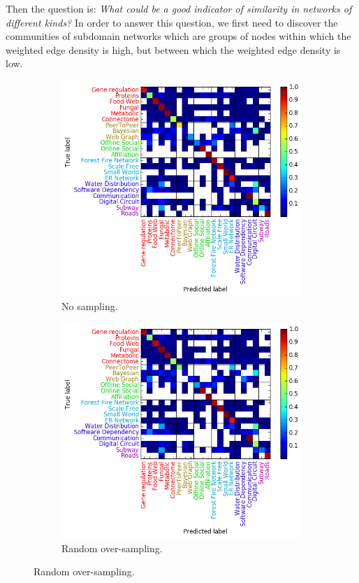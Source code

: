 \documentclass{article}
\begin{document}
Then the question is: \textit{What could be a good indicator of similarity in networks of different kinds?} In order to answer this question, we first need to discover the communities of subdomain networks which are groups of nodes within which the weighted edge density is high, but between which the weighted edge density is low.

\begin{figure}[H]
	\begin{subfigure}{0.48\textwidth}
	\includegraphics[width=\linewidth]{figs/similarity/SubDomain/None/confusion_sub_None.png}
	\caption{No sampling. } \label{no_confusion_sub}
	\end{subfigure}\hspace*{\fill}
	\begin{subfigure}{0.48\textwidth}
	\includegraphics[width=\linewidth]{figs/similarity/SubDomain/RandomOver/confusion_sub_RandomOver.png}
	\caption{Random over-sampling. } \label{random_over_confusion_sub}
	\end{subfigure}
	

\end{figure}
\end{document}

